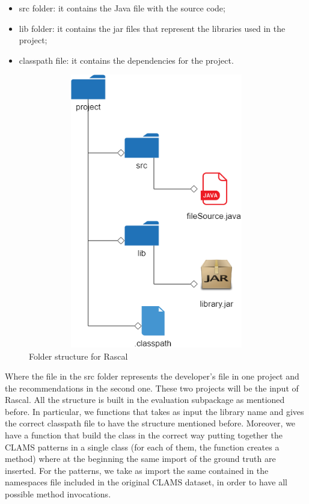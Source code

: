 \begin{itemize}
\item src folder: it contains the Java file with the source code;
\item lib folder: it contains the jar files that represent the libraries used in the project;
\item classpath file: it contains the dependencies for the project.
\end{itemize}

\begin{figure}[!h]
\includegraphics[width=12cm,height=12cm,keepaspectratio]{images/Folders.png}
\centering
  \caption{Folder structure for Rascal}
  \label{fig:cmd}
\end{figure}

Where the file in the src folder represents the developer's file in one project and the recommendations in the second one. These two projects will be the input of Rascal. All the structure is built in the evaluation subpackage as mentioned before. In particular, we functions that takes as input the library name and gives the correct classpath file to have the structure mentioned before. Moreover, we have a function that build the class in the correct way putting together the CLAMS patterns in a single class (for each of them, the function creates a method) where at the beginning the same import of the ground truth are inserted. For the patterns, we take as import the same contained in the namespaces file included in the original CLAMS dataset, in order to have all possible method invocations.

